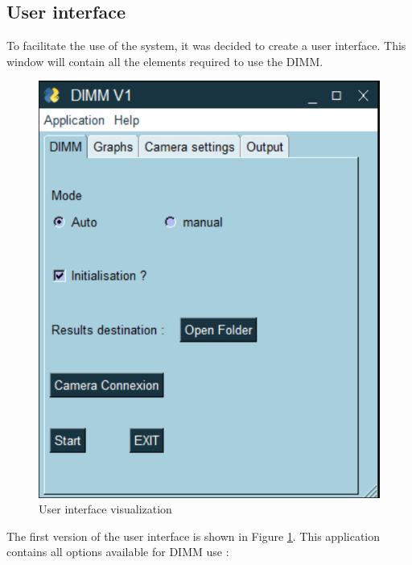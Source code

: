 \subsection{User interface}
To facilitate the use of the system, it was decided to create a user interface.
This window will contain all the elements required to use the DIMM.
\begin{figure}[H]
    \centering
    \includegraphics[scale=0.85]{assets/figures/Software/GUI1.png}
    \caption{User interface visualization}
    \label{fig:Soft_GUI}
\end{figure}
The first version of the user interface is shown in Figure \ref{fig:Soft_GUI}.
This application contains all options available for DIMM use :
